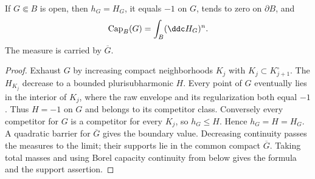 \begin{proposition}\label{prop:relative-extremal-open}
If $G\Subset B$ is open, then $h_G=H_G$, it equals $-1$ on $G$, tends to zero on $\partial B$, and
\[
 \operatorname{Cap}_B(G)=\int_B(\ddc H_G)^n.
\]
The measure is carried by $\overline G$.
\end{proposition}
\begin{proof}
Exhaust $G$ by increasing compact neighborhoods $K_j$ with $K_j\subset K_{j+1}^\circ$. The $H_{K_j}$ decrease to a bounded plurisubharmonic $H$. Every point of $G$ eventually lies in the interior of $K_j$, where the raw envelope and its regularization both equal $-1$. Thus $H=-1$ on $G$ and belongs to its competitor class. Conversely every competitor for $G$ is a competitor for every $K_j$, so $h_G\le H$. Hence $h_G=H=H_G$. A quadratic barrier for $\overline G$ gives the boundary value. Decreasing continuity passes the measures to the limit; their supports lie in the common compact $\overline G$. Taking total masses and using Borel capacity continuity from below gives the formula and the support assertion.
\end{proof}

